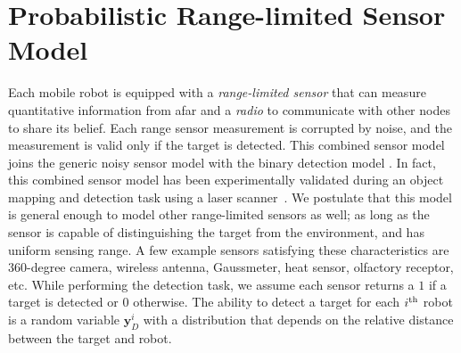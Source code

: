 \documentclass[letterpaper, 10 pt, conference]{ieeeconf}
\newcommand{\Ram}[1]{{\normalsize{\textbf{({\color{green}Ram:\ }#1)}}}}
\newcommand{\rood}[1]{{\color{red}{[#1]}}}
\begin{document}
\section{Probabilistic Range-limited Sensor Model}
\label{sec:sec3}
Each mobile robot is equipped with a \emph{range-limited sensor} that can measure quantitative information from afar and a \emph{radio} to communicate with other nodes to share its belief. 
Each range sensor measurement is corrupted by noise, and the measurement is valid only if the target is detected.
This combined sensor model joins the generic noisy sensor model with the binary detection model \cite{djuric2008target}.
In fact, this combined sensor model has been experimentally validated during an object mapping and detection task using a laser scanner~\cite{anguelov2004detecting}.
We postulate that this model is general enough to model other range-limited sensors as well; as long as the sensor is capable of distinguishing the target from the environment, and has uniform sensing range. 
A few example sensors satisfying these characteristics are 360-degree camera, wireless antenna, Gaussmeter, heat sensor, olfactory receptor, etc.
While performing the detection task, we assume each sensor returns a $1$ if a target is detected or $0$ otherwise. 
The ability to detect a target for each $i^{\textup{th}}$ robot is a \rood{binary} random variable $\bm{y}_D^i$ with a distribution that depends on the relative distance between the target and robot. 
\end{document}
